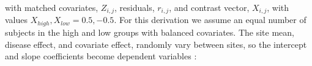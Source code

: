 with matched covariates, $Z_{i,j}$, residuals, $r_{i,j}$, and contrast vector, $X_{i,j}$, with values $X_{high}, X_{low} = 0.5,-0.5$. For this derivation we assume an equal number of subjects in the high and low groups with balanced covariates. The site mean, disease effect, and covariate effect, randomly vary between sites, so the intercept and slope coefficients become dependent variables \cite{Raudenbush2000}: